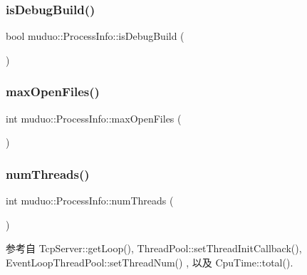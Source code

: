\subsubsection{\texorpdfstring{is\+Debug\+Build()}{isDebugBuild()}}
{\footnotesize\ttfamily bool muduo\+::\+Process\+Info\+::is\+Debug\+Build (\begin{DoxyParamCaption}{ }\end{DoxyParamCaption})}

\mbox{\label{namespacemuduo_1_1ProcessInfo_a2bb52b7cbab50f7bc977048005845c67}} 
\subsubsection{\texorpdfstring{max\+Open\+Files()}{maxOpenFiles()}}
{\footnotesize\ttfamily int muduo\+::\+Process\+Info\+::max\+Open\+Files (\begin{DoxyParamCaption}{ }\end{DoxyParamCaption})}

\mbox{\label{namespacemuduo_1_1ProcessInfo_a120db223841da7c65566c1fb2a06befa}} 
\subsubsection{\texorpdfstring{num\+Threads()}{numThreads()}}
{\footnotesize\ttfamily int muduo\+::\+Process\+Info\+::num\+Threads (\begin{DoxyParamCaption}{ }\end{DoxyParamCaption})}



参考自 Tcp\+Server\+::get\+Loop(), Thread\+Pool\+::set\+Thread\+Init\+Callback(), Event\+Loop\+Thread\+Pool\+::set\+Thread\+Num() , 以及 Cpu\+Time\+::total().

